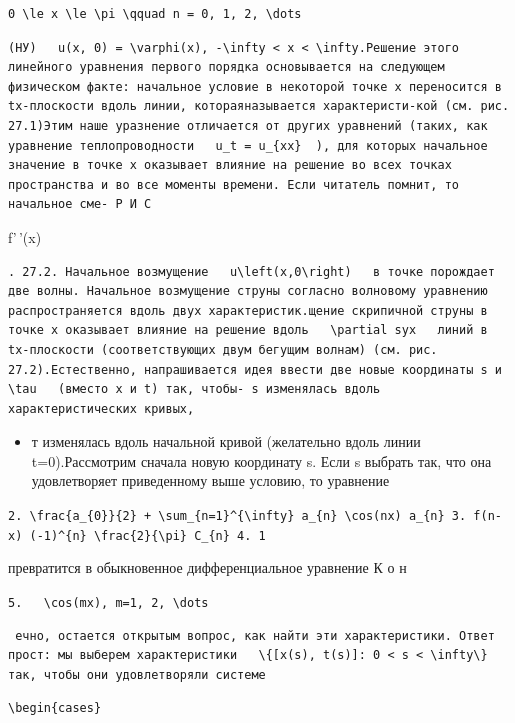 \documentclass[
  ukrainian,
]{article}
\providecommand{\tightlist}{%
  \setlength{\itemsep}{0pt}\setlength{\parskip}{0pt}}
\begin{document}
\begin{verbatim}
0 \le x \le \pi \qquad n = 0, 1, 2, \dots
\end{verbatim}

\begin{verbatim}
(НУ)   u(x, 0) = \varphi(x), -\infty < x < \infty.Решение этого линейного уравнения первого порядка основывается на следующем физическом факте: начальное условие в некоторой точке x переносится в tx-плоскости вдоль линии, котораяназывается характеристи-кой (см. рис. 27.1)Этим наше уразнение отличается от других уравнений (таких, как уравнение теплопроводности   u_t = u_{xx}  ), для которых начальное значение в точке x оказывает влияние на решение во всех точках пространства и во все моменты времени. Если читатель помнит, то начальное сме- Р И С
\end{verbatim}

f'\,'(x)

\begin{verbatim}
. 27.2. Начальное возмущение   u\left(x,0\right)   в точке порождает две волны. Начальное возмущение струны согласно волновому уравнению распространяется вдоль двух характеристик.щение скрипичной струны в точке x оказывает влияние на решение вдоль   \partial syx   линий в tx-плоскости (соответствующих двум бегущим волнам) (см. рис. 27.2).Естественно, напрашивается идея ввести две новые координаты s и   \tau   (вместо x и t) так, чтобы- s изменялась вдоль характеристических кривых,
\end{verbatim}

\begin{itemize}
\tightlist
\item
  т изменялась вдоль начальной кривой (желательно вдоль линии
  t=0).Рассмотрим сначала новую координату s. Если s выбрать так, что
  она удовлетворяет приведенному выше условию, то уравнение
\end{itemize}

\texttt{2.\ \textquotesingle{}\textbackslash{}frac\{a\_\{0\}\}\{2\}\ +\ \textbackslash{}sum\_\{n=1\}\^{}\{\textbackslash{}infty\}\ a\_\{n\}\ \textbackslash{}cos(nx)\textquotesingle{}\ \textquotesingle{}a\_\{n\}\textquotesingle{}\ 3.\ \textquotesingle{}f(n-x)\textquotesingle{}\ \textquotesingle{}(-1)\^{}\{n\}\ \textbackslash{}frac\{2\}\{\textbackslash{}pi\}\ C\_\{n\}\textquotesingle{}\ 4.\ 1}

превратится в обыкновенное дифференциальное уравнение К о н

\texttt{5.\ \ \ \textbackslash{}cos(mx),\ m=1,\ 2,\ \textbackslash{}dots}

\begin{verbatim}
 ечно, остается открытым вопрос, как найти эти характеристики. Ответ прост: мы выберем характеристики   \{[x(s), t(s)]: 0 < s < \infty\}   так, чтобы они удовлетворяли системе
\end{verbatim}

\begin{verbatim}
\begin{cases}
\end{verbatim}
\end{document}
